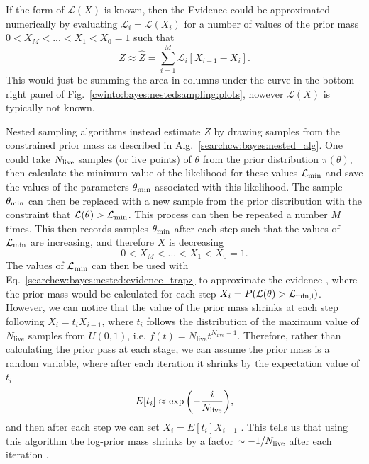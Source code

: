 If the form of $\mathcal{L}(X)$ is known, then the Evidence could be approximated numerically by evaluating $\mathcal{L}_i = \mathcal{L}(X_i)$ for a number of values of the prior mass $0 < X_M < ... < X_1 < X_0 = 1$ such that
\begin{equation}
\label{searchcw:bayes:nested:evidence_trapz}
Z \approx \hat{Z} = \sum_{i=1}^{M} \mathcal{L}_i \left[  X_{i-1} - X_{i}\right].
\end{equation} 
This would just be summing the area in columns under the curve in the bottom right panel of Fig.~\ref{cwinto:bayes:nestedsampling:plots}, however $\mathcal{L}(X)$  is typically not known.

Nested sampling algorithms instead estimate $Z$ by drawing samples from the constrained prior mass as described in Alg.~\ref{searchcw:bayes:nested_alg}.
One could take $N_{\rm{live}}$ samples (or live points) of $\theta$ from the prior distribution $\pi(\theta)$, then calculate the minimum value of the likelihood for these values $\mathcal{L}_{\rm{min}}$ and save the values of the parameters $\theta_{\rm{min}}$ associated with this likelihood.
The sample $\theta_{\rm{min}}$ can then be replaced with a new sample from the prior distribution with the constraint that $\mathcal{L}(\theta) > \mathcal{L}_{\rm{min}}$. This process can then be repeated a number $M$ times.
This then records samples $\theta_{\rm{min}}$ after each step such that the values of $\mathcal{L}_{\rm{min}}$ are increasing, and therefore $X$ is decreasing
\begin{equation}
	0 < X_M < ... < X_1 < X_0 = 1.
\end{equation}
The values of $\mathcal{L}_{\rm{min}}$ can then be used with Eq.~\ref{searchcw:bayes:nested:evidence_trapz} to approximate the evidence , where the prior mass would be calculated for each step $X_i = P(\mathcal{L}(\theta) > \mathcal{L}_{\rm{min},i})$.
However, we can notice that the value of the prior mass shrinks at each step following $X_i = t_i X_{i-1}$, where $t_i$ follows the distribution of the maximum value of $N_{\text{live}}$ samples from $U(0,1)$, i.e. $f(t) = N_{\text{live}} t^{N_{\text{live}} - 1}$.
Therefore, rather than calculating the prior pass at each stage, we can assume the prior mass is a random variable, where after each iteration it shrinks by the expectation value of $t_i$
\begin{equation}
E[t_i] \approx \exp{\left(-\frac{i}{N_{\rm{live}}}\right)},
\end{equation}
%
and then after each step we can set $X_i = E[t_i] X_{i-1}$ \citep{feroz2019ImportanceNested}.
This tells us that using this algorithm the log-prior mass shrinks by a factor $\sim -1/N_{\rm{live}}$ after each iteration \citep{speagle2019DynestyDynamic}. 

